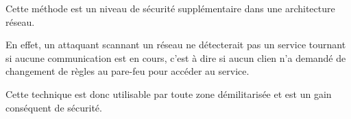 Cette méthode est un niveau de sécurité supplémentaire dans une architecture réseau. 

En effet, un attaquant scannant un réseau ne détecterait pas un service tournant si aucune communication est en cours, c'est à dire si aucun clien n'a demandé de changement de règles au pare-feu pour accéder au service.

Cette technique est donc utilisable par toute zone démilitarisée et est un gain conséquent de sécurité.

